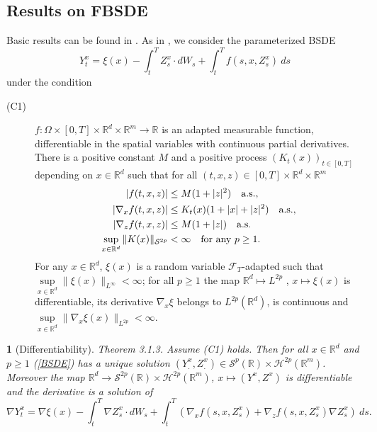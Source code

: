 \documentclass[12,english]{amsart}
\theoremstyle{plain}
\newtheorem{thm}{\protect\theoremname}
\theoremstyle{definition}
\theoremstyle{plain}
\theoremstyle{plain}
\theoremstyle{remark}
\providecommand{\theoremname}{Theorem}
\newcommand{\R}{\mathbb R}
\newcommand{\cF}{\mathcal F}
\newcommand{\cH}{\mathcal H}
\newcommand{\cS}{\mathcal S}
\newcommand{\Om}{\Omega}
\begin{document}
\subsection{Results on FBSDE\label{subsec:FBSDE}}

Basic results can be found in
\cite{ankirchner2007classical,ankirchner2010pricing,dos2010some,dos2011some,imkeller2010path}.
As in \cite{dos2010some}, we consider the parameterized BSDE
\begin{equation}
  \label{BSDE}
Y_t^x= \xi(x)-\int_t^TZ_s^x\cdot dW_s+\int_t^Tf(s,x,Z_s^x)\ ds
\end{equation}
under the condition
\begin{description}
\item[(C1)]
$f : \Om \times [0, T] \times \R^d \times \R^m \to \R$ is an
adapted measurable function, differentiable in the spatial variables with
continuous partial derivatives. There is a positive constant $M$ and a
positive process $(K_t(x))_{t\in[0,T ]}$ depending on $x\in \R^d$ such that for all
$(t, x, z)  \in[0, T ] \times\R^d\times\R^m$
\begin{align*}
  |f (t, x, z)| &\le M (1 + |z|^2 )  \quad\hbox{a.s.},\\
|\nabla_x f (t, x, z)|& \le K_t(x)(1 + |x| + |z|^2 ) \quad\hbox{a.s.},\\
|\nabla_z f (t, x, z)|& \le M (1 + |z|) \quad\hbox{a.s.}\\
\sup_{x\in\R^d}\|K(x)\|_{\cS^{2p}} &<\infty  \quad\hbox{for any }
  p\ge 1.
\end{align*}
For any $x \in\R^d$, $\xi(x)$ is a random variable 
$\cF_T$-adapted such that $\sup\limits_{x\in\R^d}\|\xi(x)\|_{L^\infty} < \infty$;
for all $p\ge 1$ the map $\R^d\mapsto L^{2p}$ ,
$x\mapsto \xi(x)$ is differentiable, its derivative $\nabla_x\xi$
belongs to $L^{2p}(\R^d)$, is continuous and
$\sup\limits_{x\in\R^d}\|\nabla_x\xi(x)\|_{L^{2p}}<\infty$.
\end{description}
\begin{thm}[Differentiability]\label{difDosReis}\cite{dos2010some} Theorem 3.1.3.
  Assume (C1) holds. Then for all $x\in\R^d$ and $p\ge 1$
  (\ref{BSDE}) has a unique solution $(Y^x_.,Z^x_.)\in\cS^p(\R)\times\cH^{2p}(\R^m)$.
Moreover the map $\R^d\to\cS^{2p}(\R)\times\cH^{2p}(\R^m)$,
$x\mapsto(Y^x,Z^x)$ is differentiable and the derivative is a solution
of
\begin{equation}
  \label{derYparam}
  \nabla Y_t^x= \nabla\xi(x)-\int_t^T\nabla Z_s^x\cdot dW_s+
  \int_t^T(\nabla_xf(s,x,Z_s^x)+\nabla_zf(s,x,Z_s^x)\nabla  Z_s^x)\ ds.
  \end{equation}
\end{thm}
\end{document}
